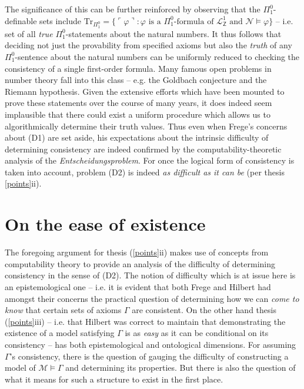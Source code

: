 \documentclass[11pt,fleqn,leqno]{article}
\def\phi{\varphi}
\begin{document}
The significance of this can be further reinforced by observing that the $\Pi^0_1$-definable sets include $\mathrm{Tr}_{\Pi^0_1} = \{\ulcorner \phi \urcorner : \phi \text{ is a $\Pi^0_1$-formula of $\mathcal{L}^1_{\mathsf{Z}}$ and } \mathcal{N} \models \phi\}$ -- i.e. set of all \textsl{true} $\Pi^0_1$-statements about the natural numbers.  It thus follows that deciding not just the provability from specified axioms but also the \textsl{truth} of any $\Pi^0_1$-sentence about the natural numbers can be uniformly reduced to checking the consistency of a single first-order formula.  Many famous open problems in number theory fall into this class -- e.g. the Goldbach conjecture and the Riemann hypothesis.  Given the extensive efforts which have been mounted to prove these statements over the course of many years, it does indeed seem implausible that there could exist a uniform procedure which  allows us to algorithmically determine their truth values.  Thus even when Frege's concerns about (D1) are set aside, his expectations about the intrinsic difficulty of determining consistency are indeed confirmed by the computability-theoretic analysis of the \textsl{Entscheidungsproblem}.  For once the logical form of consistency is taken into account, problem (D2) is indeed \textsl{as difficult as it can be} (per thesis \ref{points}ii).   

\section{On the ease of existence}

The foregoing argument for thesis (\ref{points}ii) makes use of concepts from computability theory to provide an analysis of the difficulty of determining consistency in the sense of (D2).   The notion of difficulty which is at issue here is an epistemological one -- i.e. it is evident that both Frege and Hilbert had amongst their concerns the practical question of determining how we can \textsl{come to know} that certain sets of axioms $\Gamma$ are consistent.   On the other hand thesis (\ref{points}iii) -- i.e. that Hilbert was correct to maintain that demonstrating the existence of a model satisfying $\Gamma$ is as \textsl{easy} as it can be conditional on its consistency -- has both epistemological and ontological dimensions.   For assuming $\Gamma$'s consistency, there is the question of gauging the difficulty of constructing a model of $\mathcal{M} \models \Gamma$ and determining its properties.   But 
there is also the question of what it means for such a structure to exist in the first place.
\end{document}
